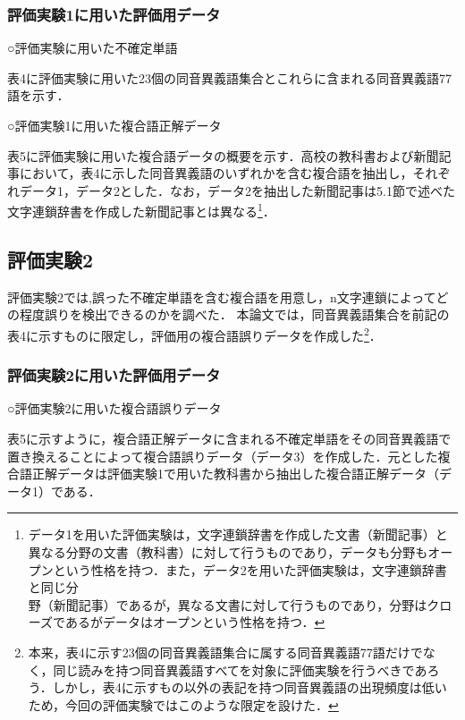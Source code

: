 \subsubsection{評価実験1に用いた評価用データ}
\begin{description}
\item{○評価実験に用いた不確定単語}

表4に評価実験に用いた23個の同音異義語集合とこれらに含まれる同音異義語77語を示す．
\begin{figure}[htbp]
\begin{center}
\end{center}
\end{figure}

\item{○評価実験1に用いた複合語正解データ}

表5に評価実験に用いた複合語データの概要を示す．高校の教科書および新聞記事において，表4に示した同音異義語のいずれかを含む複合語を抽出し，それぞれデータ1，データ2とした．なお，データ2を抽出した新聞記事は5.1節で述べた文字連鎖辞書を作成した新聞記事とは異なる\footnote{データ1を用いた評価実験は，文字連鎖辞書を作成した文書（新聞記事）と異なる分野の文書（教科書）に対して行うものであり，データも分野もオープンという性格を持つ．また，データ2を用いた評価実験は，文字連鎖辞書と同じ分\\野（新聞記事）であるが，異なる文書に対して行うものであり，分野はクローズであるがデータはオープンという性格を持つ．}．

\begin{figure}[htbp]
\begin{center}
\end{center}
\end{figure}
\end{description}

\subsection{評価実験2}
評価実験2では,誤った不確定単語を含む複合語を用意し，n文字連鎖によってどの程度誤りを検出できるのかを調べた．
本論文では，同音異義語集合を前記の表4に示すものに限定し，評価用の複合語誤りデータを作成した\footnote{本来，表4に示す23個の同音異義語集合に属する同音異義語77語だけでなく，同じ読みを持つ同音異義語すべてを対象に評価実験を行うべきであろう．しかし，表4に示すもの以外の表記を持つ同音異義語の出現頻度は低いため，今回の評価実験ではこのような限定を設けた．}．
\subsubsection{評価実験2に用いた評価用データ}
\begin{description}
\item{○評価実験2に用いた複合語誤りデータ}

表5に示すように，複合語正解データに含まれる不確定単語をその同音異義語で置き換えることによって複合語誤りデータ（データ3）を作成した．元とした複合語正解データは評価実験1で用いた教科書から抽出した複合語正解データ（データ1）である．
\end{description}
